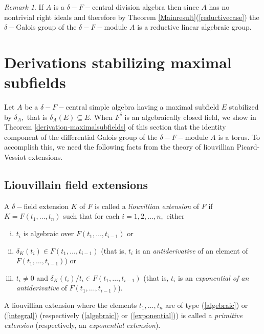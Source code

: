 \documentclass[preprint, 11pt]{amsart}
\theoremstyle{corollary}
\theoremstyle{remark}
\newtheorem{remark}[theorem]{Remark}
\theoremstyle{proposition}
\numberwithin{equation}{subsection}
\begin{document}
\begin{remark} If $A$ is a $\delta-F-$central division algebra then since $A$ has no nontrivial right ideals and therefore by Theorem \ref{Mainresult}(\ref{reductivecase}) the $\delta-$Galois group of the $\delta-F-$module $A$ is a reductive linear algebraic group.
	\end{remark}

\section{Derivations stabilizing maximal subfields}\label{maxsubfield-stability}

 Let $A$ be a $\delta-F-$central simple algebra having a maximal subfield $E$  stabilized by $\delta_A,$ that is  $\delta_A(E)\subseteq E$. 
 When $F^{\delta}$ is an algebraically closed field, we show in Theorem \ref{derivation-maximalsubfields} of this section  that the identity component of the differential Galois group of the $\delta-F-$module $A$ is a torus. To accomplish this, we need the following facts from the theory of  liouvillian Picard-Vessiot extensions.
 
\subsection{Liouvillain field extensions} A $\delta-$field extension $K$ of $F$ is called a \emph{liouvillian extension} of $F$ if $K=F(t_1,\dots, t_n)$ such that for each $i=1,2,\dots,n,$ either \begin{enumerate}[(i)] \item \label{algebraic}$t_i$ is  algebraic over $F(t_1,\dots, t_{i-1})$ or \item\label{integral} $\delta_K(t_i)\in F(t_1,\dots, t_{i-1})$ (that is,  $t_i$ is an \emph{antiderivative} of an element of $F(t_1,\dots, t_{i-1})$) or \item\label{exponential} $t_i\neq 0$ and $\delta_K(t_i)/t_i\in F(t_1,\dots, t_{i-1})$ (that is, $t_i$ is an \emph{exponential of an antiderivative} of $F(t_1,\dots, t_{i-1})$). \end{enumerate} 
A liouvillian extension where the elements $t_1,\dots, t_n$ are of type (\ref{algebraic}) or (\ref{integral}) (respectively (\ref{algebraic}) or (\ref{exponential})) is called a \emph{primitive extension} (respectively, an \emph{exponential extension}).


\end{document}
